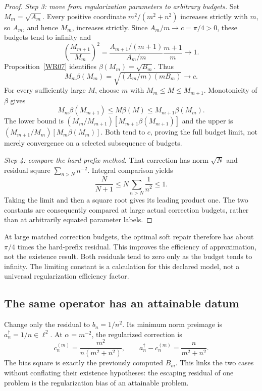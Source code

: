 \begin{proof}
\emph{Step 3: move from regularization parameters to arbitrary budgets.} Set $M_m=\sqrt{A_m}$. Every positive coordinate $m^2/(m^2+n^2)$ increases strictly with $m$, so $A_m$, and hence $M_m$, increases strictly. Since $A_m/m\to c=\pi/4>0$, these budgets tend to infinity and
\[
 \left(\frac{M_{m+1}}{M_m}\right)^2
 =\frac{A_{m+1}/(m+1)}{A_m/m}\frac{m+1}{m}\longrightarrow1.
\]
Proposition~\ref{WR07} identifies $\beta(M_m)=\sqrt{B_m}$. Thus
\[
 M_m\beta(M_m)=\sqrt{(A_m/m)(mB_m)}\longrightarrow c.
\]
For every sufficiently large $M$, choose $m$ with $M_m\le M\le M_{m+1}$. Monotonicity of $\beta$ gives
\[
 M_m\beta(M_{m+1})\le M\beta(M)\le M_{m+1}\beta(M_m).
\]
The lower bound is $(M_m/M_{m+1})[M_{m+1}\beta(M_{m+1})]$ and the upper is $(M_{m+1}/M_m)[M_m\beta(M_m)]$. Both tend to $c$, proving the full budget limit, not merely convergence on a selected subsequence of budgets.

\emph{Step 4: compare the hard-prefix method.} That correction has norm $\sqrt N$ and residual square $\sum_{n>N}n^{-2}$. Integral comparison yields
\[
 \frac{N}{N+1}\le N\sum_{n>N}\frac1{n^2}\le1.
\]
Taking the limit and then a square root gives its leading product one. The two constants are consequently compared at large actual correction budgets, rather than at arbitrarily equated parameter labels.
\end{proof}

At large matched correction budgets, the optimal soft repair therefore has about $\pi/4$ times the hard-prefix residual. This improves the efficiency of approximation, not the existence result. Both residuals tend to zero only as the budget tends to infinity. The limiting constant is a calculation for this declared model, not a universal regularization efficiency factor.


\subsection{The same operator has an attainable datum}
Change only the residual to $b_n=1/n^2$. Its minimum norm preimage is $a^\dagger_n=1/n\in\ell^2$. At $\alpha=m^{-2}$, the regularized correction is
\[
 c^{(m)}_n=\frac{m^2}{n(m^2+n^2)},\qquad
 a^\dagger_n-c^{(m)}_n=\frac{n}{m^2+n^2}.
\]
The bias square is exactly the previously computed $B_m$. This links the two cases without conflating their existence hypotheses: the escaping residual of one problem is the regularization bias of an attainable problem.

